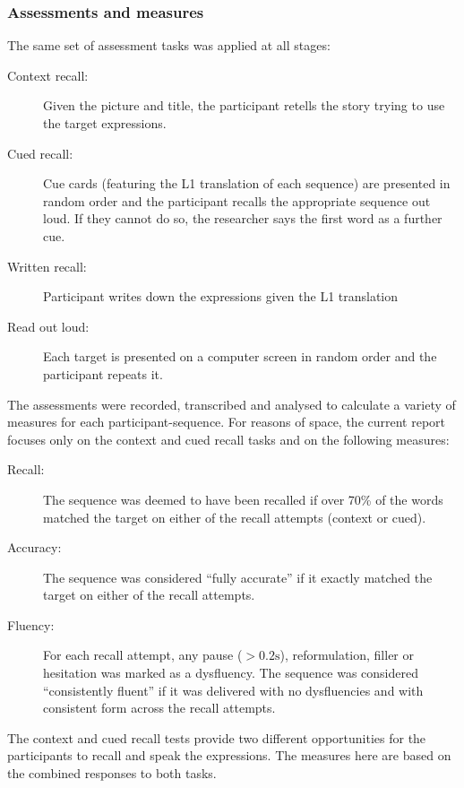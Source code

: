 \documentclass[output=paper]{langscibook}
\begin{document}
\subsubsection{Assessments and measures}\label{sec:cutler:2.2.4}

The same set of assessment tasks was applied at all stages:

\begin{description}
\item[Context recall:] Given the picture and title, the participant retells the story trying to use the target expressions. 
\item[Cued recall:] Cue cards (featuring the L1 translation of each sequence) are presented in random order and the participant recalls the appropriate sequence out loud. If they cannot do so, the researcher says the first word as a further cue. 
\item[Written recall:] Participant writes down the expressions given the L1 translation
\item[Read out loud:] Each target is presented on a computer screen in random order and the participant repeats it.
\end{description}

The assessments were recorded, transcribed and analysed to calculate a variety of measures for each participant-sequence. For reasons of space, the current report focuses only on the context and cued recall tasks and on the following measures:

\begin{description}
\item [Recall:] The sequence was deemed to have been recalled if over 70\% of the words matched the target on either of the recall attempts (context or cued). 
\item [Accuracy:] The sequence was considered ``fully accurate'' if it exactly matched the target on either of the recall attempts. 
\item [Fluency:] For each recall attempt, any pause ($>0.2\text{s}$), reformulation, filler or hesitation was marked as a dysfluency. The sequence was considered ``consistently fluent'' if it was delivered with no dysfluencies and with consistent form across the recall attempts. 
\end{description}

The context and cued recall tests provide two different opportunities for the participants to recall and speak the expressions. The measures here are based on the combined responses to both tasks.
\end{document}
